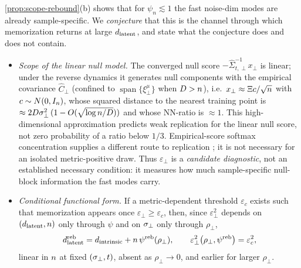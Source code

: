 \begin{remark}\label{rem:scope-rebound-conj}
\cref{prop:scope-rebound}(b) shows that for $\psi_n\lesssim1$ the fast noise-dim modes are already sample-specific. We \emph{conjecture} that this is the channel through which memorization returns at large $d_{\mathrm{latent}}$, and state what the conjecture does and does not contain.
\begin{itemize}
\item[(i)] \emph{Scope of the linear null model.} The converged null score $-\hat\Sigma_{t,\perp}^{-1}x_\perp$ is linear; under the reverse dynamics it generates null components with the empirical covariance $\hat C_\perp$ (confined to $\operatorname{span}\{\xi^\mu_\perp\}$ when $D>n$), i.e.\ $x_\perp\approx\Xi c/\sqrt{n}$ with $c\sim N(0,I_n)$, whose squared distance to the nearest training point is $\approx2D\sigma_{\perp}^2\,(1-O(\sqrt{\log n/D}))$ and whose NN-ratio is $\approx1$. This high-dimensional approximation predicts weak replication for the linear null score, not zero probability of a ratio below $1/3$. Empirical-score softmax concentration supplies a different route to replication \citep{biroli2024dynamical,scarvelis2023closedform,gu2023memorization}; it is not necessary for an isolated metric-positive draw. Thus $\varepsilon_\perp$ is a \emph{candidate diagnostic}, not an established necessary condition: it measures how much sample-specific null-block information the fast modes carry.
\item[(ii)] \emph{Conditional functional form.} If a metric-dependent threshold $\varepsilon_c$ exists such that memorization appears once $\varepsilon_\perp\ge\varepsilon_c$, then, since $\varepsilon_\perp^2$ depends on $(d_{\mathrm{latent}},n)$ only through $\psi$ and on $\sigma_{\perp}$ only through $\rho_\perp$,
\begin{equation}\label{eq:scope-rebound}
d_{\mathrm{latent}}^{\rm reb}=d_{\mathrm{intrinsic}}+n\,\psi^{\rm reb}(\rho_\perp),\qquad \varepsilon_\perp^2\big(\rho_\perp,\psi^{\rm reb}\big)=\varepsilon_c^2 ,
\end{equation}
linear in $n$ at fixed $(\sigma_{\perp},t)$, absent as $\rho_\perp\to0$, and earlier for larger $\rho_\perp$.

\end{itemize}
\end{remark}
